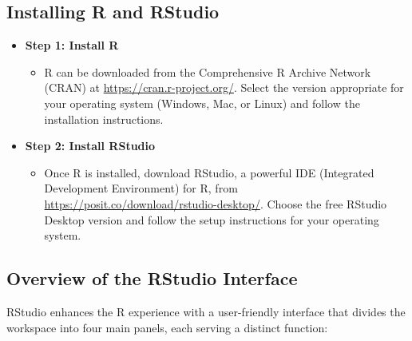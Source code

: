 \documentclass[
]{book}
\providecommand{\tightlist}{%
  \setlength{\itemsep}{0pt}\setlength{\parskip}{0pt}}
\begin{document}
\hypertarget{installing-r-and-rstudio}{%
\subsection*{Installing R and RStudio}\label{installing-r-and-rstudio}}

\begin{itemize}
\tightlist
\item
  \textbf{Step 1: Install R}

  \begin{itemize}
  \tightlist
  \item
    R can be downloaded from the Comprehensive R Archive Network (CRAN) at \url{https://cran.r-project.org/}. Select the version appropriate for your operating system (Windows, Mac, or Linux) and follow the installation instructions.
  \end{itemize}
\item
  \textbf{Step 2: Install RStudio}

  \begin{itemize}
  \tightlist
  \item
    Once R is installed, download RStudio, a powerful IDE (Integrated Development Environment) for R, from \url{https://posit.co/download/rstudio-desktop/}. Choose the free RStudio Desktop version and follow the setup instructions for your operating system.
  \end{itemize}
\end{itemize}

\hypertarget{overview-of-the-rstudio-interface}{%
\subsection*{Overview of the RStudio Interface}\label{overview-of-the-rstudio-interface}}

RStudio enhances the R experience with a user-friendly interface that divides the workspace into four main panels, each serving a distinct function:
\end{document}
